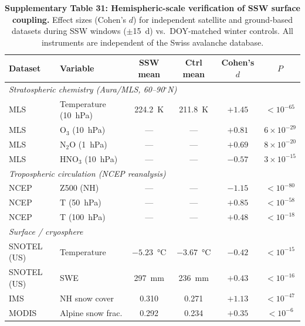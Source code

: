 \documentclass[11pt,letterpaper]{article}
\begin{document}
\begin{table}[!ht]
\centering
\caption{\textbf{Supplementary Table 31: Hemispheric-scale verification of SSW surface coupling.}
Effect sizes (Cohen's $d$) for independent satellite and ground-based datasets during SSW windows ($\pm$15~d) vs.\ DOY-matched winter controls. All instruments are independent of the Swiss avalanche database.}
\label{tab:hemispheric}
\small
\begin{tabular}{llcccc}
\toprule
Dataset & Variable & SSW mean & Ctrl mean & Cohen's $d$ & $P$ \\
\midrule
\multicolumn{6}{l}{\textit{Stratospheric chemistry (Aura/MLS, 60--90$^\circ$N)}} \\
MLS & Temperature (10~hPa) & 224.2~K & 211.8~K & $+1.45$ & $< 10^{-65}$ \\
MLS & O$_3$ (10~hPa) & --- & --- & $+0.81$ & $6 \times 10^{-29}$ \\
MLS & N$_2$O (1~hPa) & --- & --- & $+0.69$ & $8 \times 10^{-20}$ \\
MLS & HNO$_3$ (10~hPa) & --- & --- & $-0.57$ & $3 \times 10^{-15}$ \\
\midrule
\multicolumn{6}{l}{\textit{Tropospheric circulation (NCEP reanalysis)}} \\
NCEP & Z500 (NH) & --- & --- & $-1.15$ & $< 10^{-80}$ \\
NCEP & T (50~hPa) & --- & --- & $+0.85$ & $< 10^{-58}$ \\
NCEP & T (100~hPa) & --- & --- & $+0.48$ & $< 10^{-18}$ \\
\midrule
\multicolumn{6}{l}{\textit{Surface / cryosphere}} \\
SNOTEL (US) & Temperature & $-5.23$~°C & $-3.67$~°C & $-0.42$ & $< 10^{-15}$ \\
SNOTEL (US) & SWE & 297~mm & 236~mm & $+0.43$ & $< 10^{-16}$ \\
IMS & NH snow cover & 0.310 & 0.271 & $+1.13$ & $< 10^{-47}$ \\
MODIS & Alpine snow frac. & 0.292 & 0.234 & $+0.35$ & $< 10^{-6}$ \\
\bottomrule
\end{tabular}
\end{table}
\end{document}
